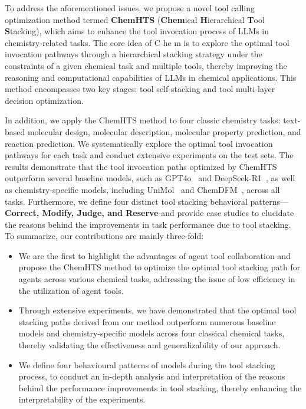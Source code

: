To address the aforementioned issues, we propose a novel tool calling optimization method termed \textbf{ChemHTS} (\textbf{Chem}ical \textbf{H}ierarchical \textbf{T}ool \textbf{S}tacking), 
which aims to enhance the tool invocation process of LLMs in chemistry-related tasks. The core idea of C he m is to explore the optimal tool invocation pathways through a hierarchical stacking strategy under the constraints of a given chemical task and multiple tools, thereby improving the reasoning and computational capabilities of LLMs in chemical applications. This method encompasses two key stages: tool self-stacking and tool multi-layer decision optimization.

In addition, we apply the ChemHTS method to four classic chemistry tasks: text-based molecular design, molecular description, molecular property prediction, and reaction prediction. We systematically explore the optimal tool invocation pathways for each task and conduct extensive experiments on the test sets.
The results demonstrate that the tool invocation paths optimized by ChemHTS outperform several baseline models, such as GPT4o~\cite{openai2024gpt4ocard} and DeepSeek-R1~\cite{deepseekai2025deepseekr1incentivizingreasoningcapability}, as well as chemistry-specific models, including UniMol~\cite{ji2024unimol2exploringmolecularpretraining} and ChemDFM~\cite{zhao2024chemdfmlargelanguagefoundation}, across all tasks. Furthermore, we define four distinct tool stacking behavioral patterns—\textbf{Correct, Modify, Judge, and Reserve}-and provide case studies to elucidate the reasons behind the improvements in task performance due to tool stacking.
To summarize, our contributions are mainly three-fold: 

\begin{itemize}
    \item We are the first to highlight the advantages of agent tool collaboration and propose the ChemHTS method to optimize the optimal tool stacking path for agents across various chemical tasks, addressing the issue of low efficiency in the utilization of agent tools.
    \item Through extensive experiments, we have demonstrated that the optimal tool stacking paths derived from our method outperform numerous baseline models and chemistry-specific models across four classical chemical tasks, thereby validating the effectiveness and generalizability of our approach.
    \item We define four behavioural patterns of models during the tool stacking process, to conduct an in-depth analysis and interpretation of the reasons behind the performance improvements in tool stacking, thereby enhancing the interpretability of the experiments.
\end{itemize}







